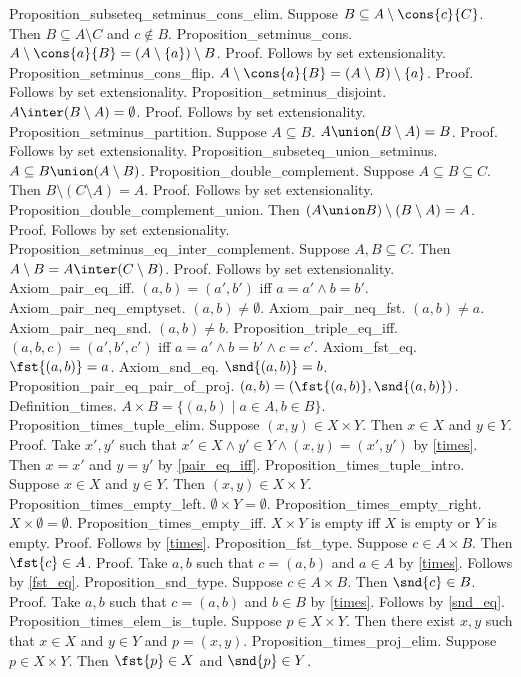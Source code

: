 Proposition_subseteq_setminus_cons_elim. Suppose $B \subseteq A \setminus \cons{c}{C}$. Then $B \subseteq A \setminus C$ and $c \notin B$.
Proposition_setminus_cons. $A \setminus  \cons{a}{B} = (A \setminus  \{a \}) \setminus B$.
Proof. Follows by set extensionality.
Proposition_setminus_cons_flip. $A \setminus  \cons{a}{B} = (A \setminus B) \setminus  \{a \}$.
Proof. Follows by set extensionality.
Proposition_setminus_disjoint. $A \inter (B \setminus A) =  \emptyset$.
Proof. Follows by set extensionality.
Proposition_setminus_partition. Suppose $A \subseteq B$. $A \union (B \setminus A) = B$.
Proof. Follows by set extensionality.
Proposition_subseteq_union_setminus. $A \subseteq B \union (A \setminus B)$.
Proposition_double_complement. Suppose $A \subseteq B \subseteq C$. Then $B \setminus (C \setminus A) = A$.
Proof. Follows by set extensionality.
Proposition_double_complement_union. Then $(A \union B) \setminus (B \setminus A) = A$.
Proof. Follows by set extensionality.
Proposition_setminus_eq_inter_complement. Suppose $A, B \subseteq C$. Then $A \setminus B = A \inter (C \setminus B)$.
Proof. Follows by set extensionality.
Axiom_pair_eq_iff. $(a, b) = (a', b')$ iff $a = a' \land b = b'$.
Axiom_pair_neq_emptyset. $(a, b)  \neq  \emptyset$.
Axiom_pair_neq_fst. $(a, b)  \neq a$.
Axiom_pair_neq_snd. $(a, b)  \neq b$.
Proposition_triple_eq_iff. $(a, b, c) = (a', b', c')$ iff $a = a'  \land b = b' \land c = c'$.
Axiom_fst_eq. $ \fst{(a, b)} = a$.
Axiom_snd_eq. $ \snd{(a, b)} = b$.
Proposition_pair_eq_pair_of_proj. $(a, b) = ( \fst{(a,b)}, \snd{(a,b)})$.
Definition_times. $A \times B =  \{ (a,b)  \mid a \in A, b \in B  \}$.
Proposition_times_tuple_elim. Suppose $(x, y) \in X \times Y$. Then $x \in X$ and $y \in Y$.
Proof. Take $x', y'$ such that $x' \in X \land y' \in Y  \land (x, y) = (x', y')$ by  \cref{times}. Then $x = x'$ and $y = y'$ by  \cref{pair_eq_iff}.
Proposition_times_tuple_intro. Suppose $x \in X$ and $y \in Y$. Then $(x, y) \in X \times Y$.
Proposition_times_empty_left. $ \emptyset \times Y =  \emptyset$.
Proposition_times_empty_right. $X \times  \emptyset =  \emptyset$.
Proposition_times_empty_iff. $X \times Y$ is empty iff $X$ is empty or $Y$ is empty.
Proof. Follows by  \cref{times}.
Proposition_fst_type. Suppose $c \in A \times B$. Then $ \fst{c} \in A$.
Proof. Take $a, b$ such that $c = (a, b)$ and $a \in A$ by  \cref{times}. Follows by  \cref{fst_eq}. %
Proposition_snd_type. Suppose $c \in A \times B$. Then $ \snd{c} \in B$.
Proof. Take $a, b$ such that $c = (a, b)$ and $b \in B$ by  \cref{times}. Follows by  \cref{snd_eq}. %
Proposition_times_elem_is_tuple. Suppose $p \in X \times Y$. Then there exist $x, y$ such that $x \in X$ and $y \in Y$ and $p = (x, y)$.
Proposition_times_proj_elim. Suppose $p \in X \times Y$. Then $ \fst{p} \in X$ and $ \snd{p} \in Y$.

